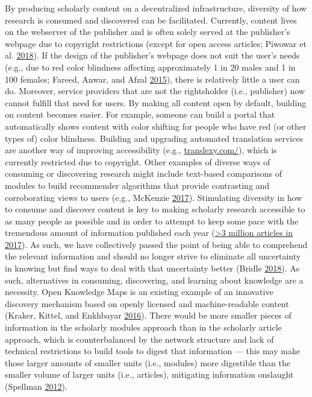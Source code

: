 \documentclass[a5paper]{book}
\begin{document}
By producing scholarly content on a decentralized infrastructure,
diversity of how research is consumed and discovered can be facilitated.
Currently, content lives on the webserver of the publisher and is often
solely served at the publisher's webpage due to copyright restrictions
(except for open access articles; Piwowar et al.
\protect\hyperlink{ref-doi:10.7717ux2fpeerj.4375}{2018}). If the design
of the publisher's webpage does not suit the user's needs (e.g., due to
red color blindness affecting approximately 1 in 20 males and 1 in 100
females; Fareed, Anwar, and Afzal
\protect\hyperlink{ref-doi:10.1016ux2fj.gendis.2015.02.006}{2015}),
there is relatively little a user can do. Moreover, service providers
that are not the rightsholder (i.e., publisher) now cannot fulfill that
need for users. By making all content open by default, building on
content becomes easier. For example, someone can build a portal that
automatically shows content with color shifting for people who have red
(or other types of) color blindness. Building and upgrading automated
translation services are another way of improving accessibility (e.g.,
\href{http://translexy.com/}{translexy.com/}), which is currently
restricted due to copyright. Other examples of diverse ways of consuming
or discovering research might include text-based comparisons of modules
to build recommender algorithms that provide contrasting and
corroborating views to users (e.g., McKenzie
\protect\hyperlink{ref-doi:10.1038ux2fnature.2017.22163}{2017}).
Stimulating diversity in how to consume and discover content is key to
making scholarly research accessible to as many people as possible and
in order to attempt to keep some pace with the tremendous amount of
information published each year
(\href{https://api.crossref.org/works?filter=type:journal-article,from-pub-date:2017,until-pub-date:2017\&rows=0}{\textgreater{}3
million articles in 2017}). As such, we have collectively passed the
point of being able to comprehend the relevant information and should no
longer strive to eliminate all uncertainty in knowing but find ways to
deal with that uncertainty better (Bridle
\protect\hyperlink{ref-isbn:9781786635471}{2018}). As such, alternatives
in consuming, discovering, and learning about knowledge are a necessity.
Open Knowledge Maps is an existing example of an innovative discovery
mechanism based on openly licensed and machine-readable content (Kraker,
Kittel, and Enkhbayar
\protect\hyperlink{ref-doi:10.12685ux2f027.7-4-2-157}{2016}). There
would be more smaller pieces of information in the scholarly modules
approach than in the scholarly article approach, which is
counterbalanced by the network structure and lack of technical
restrictions to build tools to digest that information --- this may make
those larger amounts of smaller units (i.e., modules) more digestible
than the smaller volume of larger units (i.e., articles), mitigating
information onslaught (Spellman
\protect\hyperlink{ref-doi:10.1080ux2f1047840X.2012.701161}{2012}).
\end{document}
